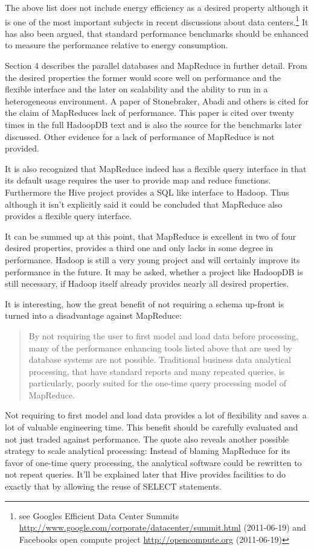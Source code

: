 \documentclass[12pt,a4paper]{scrartcl}		%
\newcommand{\citeurl}[2]{\url{#1} (#2)}
\begin{document}
The above list does not include energy efficiency as a desired property although it is one of the most important subjects in recent discussions about data centers.\footnote{see Googles Efficient Data Center Summits \citeurl{http://www.google.com/corporate/datacenter/summit.html}{2011-06-19} and Facebooks open compute project \citeurl{http://opencompute.org}{2011-06-19}} It has also been argued, that standard performance benchmarks should be enhanced to measure the performance relative to energy consumption.\cite{Fanara:2009:SEP:1692899.1692904}

Section 4 describes the parallel databases and MapReduce in further detail. From the desired properties the former would score well on performance and the flexible interface and the later on scalability and the ability to run in a heterogeneous environment. A paper of Stonebraker, Abadi and others\cite{Pavlo09} is cited for the claim of MapReduces lack of performance. This paper is cited over twenty times in the full HadoopDB text and is also the source for the benchmarks later discussed. Other evidence for a lack of performance of MapReduce is not provided.

It is also recognized that MapReduce indeed has a flexible query interface in that its default usage requires the user to provide map and reduce functions. Furthermore the Hive project provides a SQL like interface to Hadoop. Thus although it isn't explicitly said it could be concluded that MapReduce also provides a flexible query interface.

It can be summed up at this point, that MapReduce is excellent in two of four desired properties, provides a third one and only lacks in some degree in performance. Hadoop is still a very young project and will certainly improve its performance in the future. It may be asked, whether a project like HadoopDB is still necessary, if Hadoop itself already provides nearly all desired properties.

It is interesting, how the great benefit of not requiring a schema up-front is turned into a disadvantage against MapReduce:
\begin{quote}
By not requiring the user to first model and
load data before processing, many of the performance enhancing
tools listed above that are used by database systems are not possible.
Traditional business data analytical processing, that have standard
reports and many repeated queries, is particularly, poorly suited for
the one-time query processing model of MapReduce.
\end{quote}
Not requiring to first model and load data provides a lot of flexibility and saves a lot of valuable engineering time. This benefit should be carefully evaluated and not just traded against performance. The quote also reveals another possible strategy to scale analytical processing: Instead of blaming MapReduce for its favor of one-time query processing, the analytical software could be rewritten to not repeat queries. It'll be explained later that Hive provides facilities to do exactly that by allowing the reuse of SELECT statements.
\end{document}
